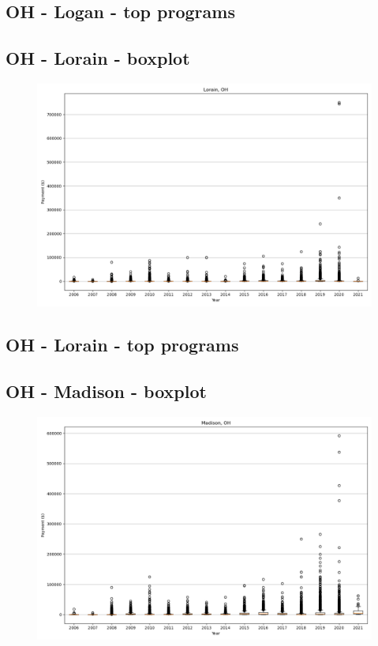 \subsection*{OH - Logan - top programs}

\newpage
\subsection*{OH - Lorain - boxplot}
\begin{figure}[h]
\centering
\includegraphics[width=7in]{../output/boxplots/counties/Lorain-OH_boxplot.png}
\end{figure}


\subsection*{OH - Lorain - top programs}

\newpage
\subsection*{OH - Madison - boxplot}
\begin{figure}[h]
\centering
\includegraphics[width=7in]{../output/boxplots/counties/Madison-OH_boxplot.png}
\end{figure}


